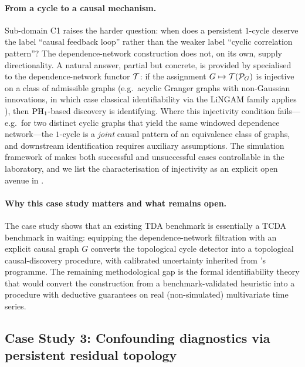 \paragraph{From a cycle to a causal mechanism.}
Sub-domain C1 raises the harder question: when does a persistent
$1$-cycle deserve the label ``causal feedback loop'' rather than the
weaker label ``cyclic correlation pattern''? The dependence-network
construction does not, on its own, supply directionality. A natural
answer, partial but concrete, is provided by 
specialised to the dependence-network functor $\mathcal{T}$: if the assignment
$G \mapsto \mathcal{T}(\mathcal{P}_G)$ is injective on a class of admissible
graphs (e.g.\ acyclic Granger graphs with non-Gaussian innovations,
in which case classical identifiability via the LiNGAM family applies
\citep{shimizu2006lingam}), then $\mathrm{PH}_{1}$-based discovery is
identifying. Where this injectivity condition fails---e.g.\ for two
distinct cyclic graphs that yield the same windowed dependence
network---the $1$-cycle is a \emph{joint} causal pattern of an
equivalence class of graphs, and downstream identification requires
auxiliary assumptions. The simulation framework of
\citet{elyaagoubi2023statistical} makes both successful and unsuccessful
cases controllable in the laboratory, and we list the
characterisation of injectivity as an explicit open avenue in
.

\paragraph{Why this case study matters and what remains open.}
The case study shows that an existing TDA benchmark is essentially a
TCDA benchmark in waiting: equipping the dependence-network filtration
with an explicit causal graph $G$ converts the topological cycle
detector into a topological causal-discovery procedure, with calibrated
uncertainty inherited from \citet{lecci2014statistical}'s programme.
The remaining methodological gap is the formal identifiability theory
that would convert the construction from a benchmark-validated heuristic
into a procedure with deductive guarantees on real (non-simulated)
multivariate time series.

\subsection{Case Study 3: Confounding diagnostics via persistent
residual topology}\label{sec:cs_confounding}

